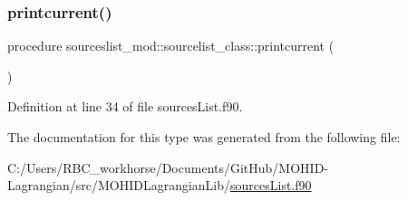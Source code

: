 \subsubsection{\texorpdfstring{printcurrent()}{printcurrent()}}
{\footnotesize\ttfamily procedure sourceslist\+\_\+mod\+::sourcelist\+\_\+class\+::printcurrent (\begin{DoxyParamCaption}{ }\end{DoxyParamCaption})\hspace{0.3cm}{\ttfamily [private]}}



Definition at line 34 of file sources\+List.\+f90.



The documentation for this type was generated from the following file\+:\begin{DoxyCompactItemize}
\item 
C\+:/\+Users/\+R\+B\+C\+\_\+workhorse/\+Documents/\+Git\+Hub/\+M\+O\+H\+I\+D-\/\+Lagrangian/src/\+M\+O\+H\+I\+D\+Lagrangian\+Lib/\mbox{\hyperlink{sources_list_8f90}{sources\+List.\+f90}}\end{DoxyCompactItemize}
